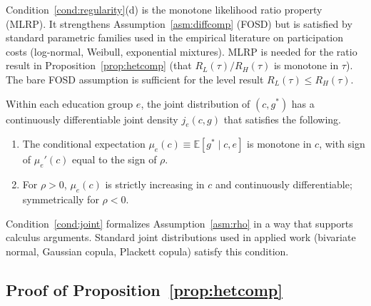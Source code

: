 Condition~\ref{cond:regularity}(d) is the monotone likelihood ratio property (MLRP). It strengthens Assumption~\ref{asm:diffcomp} (FOSD) but is satisfied by standard parametric families used in the empirical literature on participation costs (log-normal, Weibull, exponential mixtures). MLRP is needed for the ratio result in Proposition~\ref{prop:hetcomp} (that $R_L(\tau)/R_H(\tau)$ is monotone in $\tau$). The bare FOSD assumption is sufficient for the level result $R_L(\tau) \leq R_H(\tau)$.

\begin{regularitycondition}
\label{cond:joint}
Within each education group $e$, the joint distribution of $(c, g^*)$ has a continuously differentiable joint density $j_e(c, g)$ that satisfies the following.
\begin{enumerate}
    \item[(a)] The conditional expectation $\mu_e(c) \equiv \mathbb{E}[g^* \mid c, e]$ is monotone in $c$, with sign of $\mu_e'(c)$ equal to the sign of $\rho$.
    \item[(b)] For $\rho > 0$, $\mu_e(c)$ is strictly increasing in $c$ and continuously differentiable; symmetrically for $\rho < 0$.
\end{enumerate}
\end{regularitycondition}

Condition~\ref{cond:joint} formalizes Assumption~\ref{asm:rho} in a way that supports calculus arguments. Standard joint distributions used in applied work (bivariate normal, Gaussian copula, Plackett copula) satisfy this condition.

\subsection{Proof of Proposition~\ref{prop:hetcomp}}
\label{ssec:proof_hetcomp}

